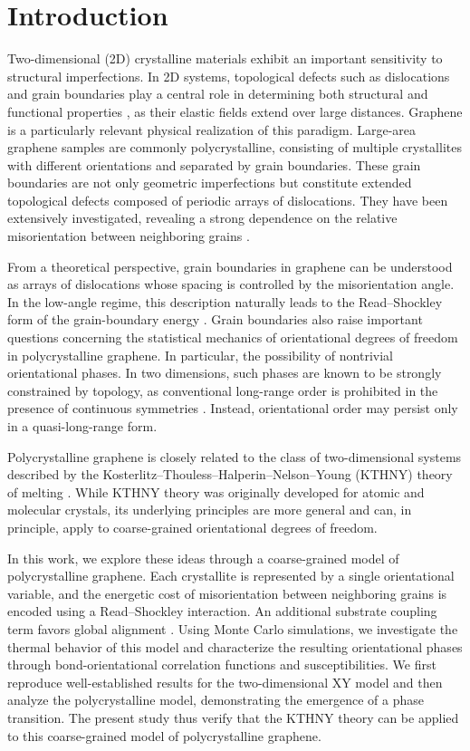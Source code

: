 \section{Introduction}

Two-dimensional (2D) crystalline materials exhibit an important sensitivity to structural imperfections. In 2D systems, topological defects such as dislocations and grain boundaries play a central role in determining both structural and functional properties \cite{Mermin1968}, as their elastic fields extend over large distances. Graphene is a particularly relevant physical realization of this paradigm. Large-area graphene samples are commonly polycrystalline, consisting of multiple crystallites with different orientations and separated by grain boundaries. These grain boundaries are not only geometric imperfections but constitute extended topological defects composed of periodic arrays of dislocations. They have been extensively investigated, revealing a strong dependence on the relative misorientation between neighboring grains \cite{Yazyev2010}.

From a theoretical perspective, grain boundaries in graphene can be understood as arrays of dislocations whose spacing is controlled by the misorientation angle. In the low-angle regime, this description naturally leads to the Read--Shockley form of the grain-boundary energy \cite{Read1950}. Grain boundaries also raise important questions concerning the statistical mechanics of orientational degrees of freedom in polycrystalline graphene. In particular, the possibility of nontrivial orientational phases. In two dimensions, such phases are known to be strongly constrained by topology, as conventional long-range order is prohibited in the presence of continuous symmetries \cite{Mermin1966}. Instead, orientational order may persist only in a quasi-long-range form.

Polycrystalline graphene is closely related to the class of two-dimensional systems described by the Kosterlitz--Thouless--Halperin--Nelson--Young (KTHNY) theory of melting \cite{Kosterlitz1973,Nelson1978,Nelson1979,Young1979}. While KTHNY theory was originally developed for atomic and molecular crystals, its underlying principles are more general and can, in principle, apply to coarse-grained orientational degrees of freedom.

In this work, we explore these ideas through a coarse-grained model of polycrystalline graphene. Each crystallite is represented by a single orientational variable, and the energetic cost of misorientation between neighboring grains is encoded using a Read--Shockley interaction. An additional substrate coupling term favors global alignment \cite{Rogge2015}. Using Monte Carlo simulations, we investigate the thermal behavior of this model and characterize the resulting orientational phases through bond-orientational correlation functions and susceptibilities. We first reproduce well-established results for the two-dimensional XY model \cite{Kosterlitz1973} and then analyze the polycrystalline model, demonstrating the emergence of a phase transition. The present study thus verify that the KTHNY theory can be applied to this coarse-grained model of polycrystalline graphene.
